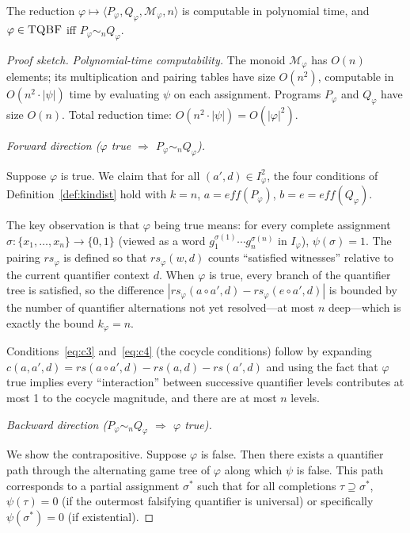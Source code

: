 \begin{theorem}
\label{thm:pspace-hard}
The reduction $\varphi \mapsto \langle P_\varphi, Q_\varphi,
\mathcal{M}_\varphi, n\rangle$ is computable in polynomial time,
and $\varphi\in\textsc{TQBF}$ iff $P_\varphi\sim_n Q_\varphi$.
\end{theorem}

\begin{proof}[Proof sketch]
\emph{Polynomial-time computability.}
The monoid $\mathcal{M}_\varphi$ has $O(n)$ elements; its
multiplication and pairing tables have size $O(n^2)$, computable
in $O(n^2\cdot|\psi|)$ time by evaluating $\psi$ on each
assignment.  Programs $P_\varphi$ and $Q_\varphi$ have size $O(n)$.
Total reduction time: $O(n^2\cdot|\psi|)=O(|\varphi|^2)$.

\medskip\noindent
\emph{Forward direction ($\varphi$ true $\Rightarrow$ $P_\varphi\sim_n Q_\varphi$).}

Suppose $\varphi$ is true.  We claim that for all $(a',d)\in
I_\varphi^2$, the four conditions of Definition~\ref{def:kindist}
hold with $k=n$, $a=\mathit{eff}(P_\varphi)$, $b=e=\mathit{eff}(Q_\varphi)$.

The key observation is that $\varphi$ being true means: for every
complete assignment $\sigma:\{x_1,\ldots,x_n\}\to\{0,1\}$ (viewed as
a word $g_1^{\sigma(1)}\cdots g_n^{\sigma(n)}$ in $I_\varphi$), $\psi(\sigma)=1$.
The pairing $\mathit{rs}_\varphi$ is defined so that $\mathit{rs}_\varphi(w,d)$
counts ``satisfied witnesses'' relative to the current quantifier
context $d$.  When $\varphi$ is true, every branch of the quantifier
tree is satisfied, so the difference $|\mathit{rs}_\varphi(a\circ a', d)
- \mathit{rs}_\varphi(e\circ a', d)|$ is bounded by the number of
quantifier alternations not yet resolved---at most $n$ deep---which
is exactly the bound $k_\varphi = n$.

Conditions~\eqref{eq:c3} and~\eqref{eq:c4} (the cocycle conditions)
follow by expanding $c(a,a',d)=\mathit{rs}(a\circ a',d)-\mathit{rs}(a,d)
-\mathit{rs}(a',d)$ and using the fact that $\varphi$ true implies
every ``interaction'' between successive quantifier levels contributes
at most 1 to the cocycle magnitude, and there are at most $n$ levels.

\medskip\noindent
\emph{Backward direction ($P_\varphi\sim_n Q_\varphi$
$\Rightarrow$ $\varphi$ true).}

We show the contrapositive.  Suppose $\varphi$ is false.  Then
there exists a quantifier path through the alternating game
tree of $\varphi$ along which $\psi$ is false.  This path
corresponds to a partial assignment $\sigma^*$ such that for all
completions $\tau\supseteq\sigma^*$, $\psi(\tau)=0$ (if the
outermost falsifying quantifier is universal) or specifically
$\psi(\sigma^*)=0$ (if existential).


\end{proof}
